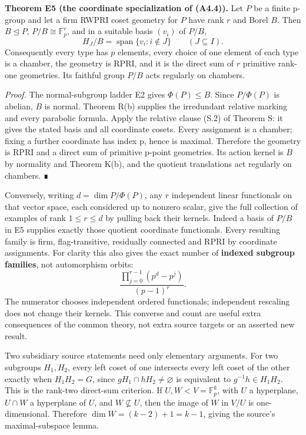\documentclass[
  10pt,
  letterpaper,
]{article}
\begin{document}
\textbf{Theorem E5 (the coordinate specialization of (A4.4)).} Let \(P\)
be a finite p-group and let a firm RWPRI coset geometry for \(P\) have
rank \(r\) and Borel \(B\). Then \(B\unlhd P\),
\(P/B\cong\mathbb F_p^r\), and in a suitable basis \((v_i)\) of \(P/B\),
\[
H_J/B=\operatorname{span}\{v_i:i\notin J\}
\qquad(J\subseteq I).
\tag{A6.5}
\] Consequently every type has \(p\) elements, every choice of one
element of each type is a chamber, the geometry is RPRI, and it is the
direct sum of \(r\) primitive rank-one geometries. Its faithful group
\(P/B\) acts regularly on chambers.

\emph{Proof.} The normal-subgroup ladder E2 gives \(\Phi(P)\le B\).
Since \(P/\Phi(P)\) is abelian, \(B\) is normal. Theorem R(b) supplies
the irredundant relative marking and every parabolic formula. Apply the
relative clause (S.2) of Theorem S: it gives the stated basis and all
coordinate cosets. Every assignment is a chamber; fixing a further
coordinate has index p, hence is maximal. Therefore the geometry is RPRI
and a direct sum of primitive p-point geometries. Its action kernel is
\(B\) by normality and Theorem K(b), and the quotient translations act
regularly on chambers. ∎

Conversely, writing \(d=\dim P/\Phi(P)\), any \(r\) independent linear
functionals on that vector space, each considered up to nonzero scalar,
give the full collection of examples of rank \(1\leq r\leq d\) by
pulling back their kernels. Indeed a basis of \(P/B\) in E5 supplies
exactly those quotient coordinate functionals. Every resulting family is
firm, flag-transitive, residually connected and RPRI by coordinate
assignments. For clarity this also gives the exact number of
\textbf{indexed subgroup families}, not automorphism orbits: \[
\frac{\prod_{j=0}^{r-1}(p^d-p^j)}{(p-1)^r}.
\tag{A6.6}
\] The numerator chooses independent ordered functionals; independent
rescaling does not change their kernels. This converse and count are
useful extra consequences of the common theory, not extra source targets
or an asserted new result.

Two subsidiary source statements need only elementary arguments. For two
subgroups \(H_1,H_2\), every left coset of one intersects every left
coset of the other exactly when \(H_1H_2=G\), since
\(gH_1\cap hH_2\ne\varnothing\) is equivalent to \(g^{-1}h\in H_1H_2\).
This is the rank-two direct-sum criterion. If \(U,W<V=\mathbb F_p^k\),
with \(U\) a hyperplane, \(U\cap W\) a hyperplane of \(U\), and
\(W\not\subseteq U\), then the image of \(W\) in \(V/U\) is
one-dimensional. Therefore \(\dim W=(k-2)+1=k-1\), giving the source's
maximal-subspace lemma.
\end{document}
